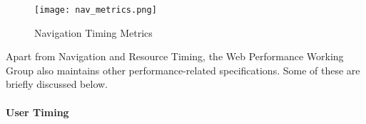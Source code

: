 








\begin{figure}[h!]
\begin{center}
\texttt{[image: nav\_metrics.png]}
\caption{Navigation Timing Metrics}
\label{figure:navigation_timing_metrics}
\end{center}
\end{figure}


Apart from Navigation and Resource Timing, the Web Performance Working Group also maintains other performance-related specifications.
Some of these are briefly discussed below.


\paragraph{User Timing} %

